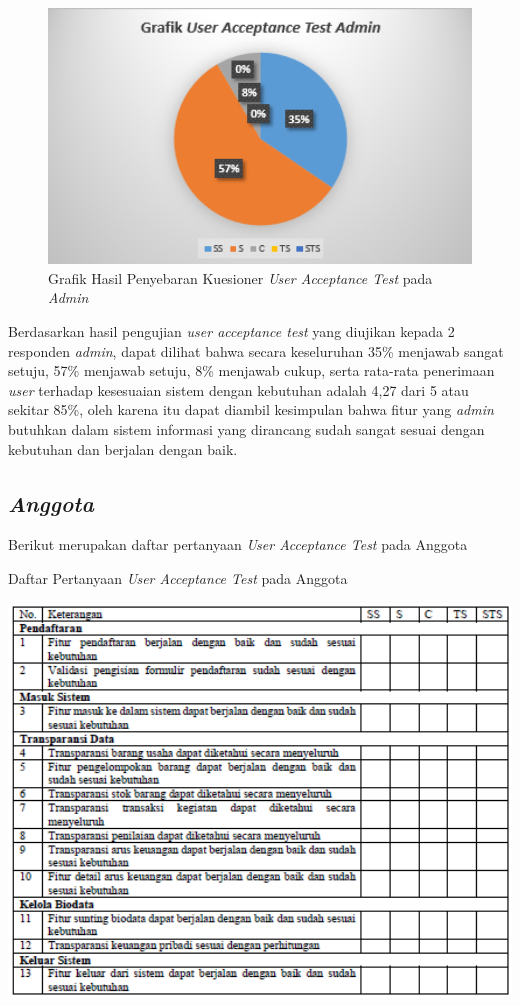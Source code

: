 \begin{figure}[H]
	\centering
	\includegraphics[width=1\textwidth]{gambar/Grafik_Admin}
	\caption{Grafik Hasil Penyebaran Kuesioner \textit{User Acceptance Test} pada \textit{Admin}}
\end{figure}

Berdasarkan hasil pengujian \textit{user acceptance test} yang diujikan kepada 2 responden \textit{admin}, dapat dilihat bahwa secara keseluruhan 35\% menjawab sangat setuju, 57\% menjawab setuju, 8\% menjawab cukup, serta rata-rata penerimaan \textit{user} terhadap kesesuaian sistem dengan kebutuhan adalah 4,27 dari 5 atau sekitar 85\%, oleh karena itu dapat diambil kesimpulan bahwa fitur yang \textit{admin} butuhkan dalam sistem informasi yang dirancang sudah sangat sesuai dengan kebutuhan dan berjalan dengan baik.  

\subsection{\textit{Anggota}}
Berikut merupakan daftar pertanyaan \textit{User Acceptance Test} pada Anggota

\begin{table}[H]
	\centering
	\caption{Daftar Pertanyaan \textit{User Acceptance Test} pada Anggota}
	\includegraphics[width=1\textwidth]{gambar/Tabel_Anggota}
\end{table}

